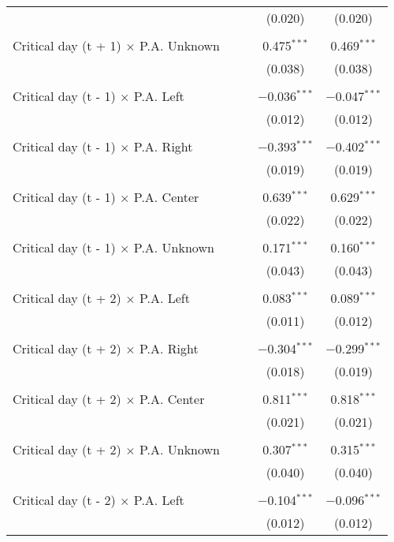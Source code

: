 \documentclass[
]{article}
\begin{document}
\begin{table}[!htbp]
{\begin{tabular}{@{\extracolsep{5pt}}lcccc}
  &  &  & (0.020) & (0.020) \\ 
  & & & & \\ 
 Critical day (t + 1) $\times$ P.A. Unknown &  &  & 0.475$^{***}$ & 0.469$^{***}$ \\ 
  &  &  & (0.038) & (0.038) \\ 
  & & & & \\ 
 Critical day (t - 1) $\times$ P.A. Left &  &  & $-$0.036$^{***}$ & $-$0.047$^{***}$ \\ 
  &  &  & (0.012) & (0.012) \\ 
  & & & & \\ 
 Critical day (t - 1) $\times$ P.A. Right &  &  & $-$0.393$^{***}$ & $-$0.402$^{***}$ \\ 
  &  &  & (0.019) & (0.019) \\ 
  & & & & \\ 
 Critical day (t - 1) $\times$ P.A. Center &  &  & 0.639$^{***}$ & 0.629$^{***}$ \\ 
  &  &  & (0.022) & (0.022) \\ 
  & & & & \\ 
 Critical day (t - 1) $\times$ P.A. Unknown &  &  & 0.171$^{***}$ & 0.160$^{***}$ \\ 
  &  &  & (0.043) & (0.043) \\ 
  & & & & \\ 
 Critical day (t + 2) $\times$ P.A. Left &  &  & 0.083$^{***}$ & 0.089$^{***}$ \\ 
  &  &  & (0.011) & (0.012) \\ 
  & & & & \\ 
 Critical day (t + 2) $\times$ P.A. Right &  &  & $-$0.304$^{***}$ & $-$0.299$^{***}$ \\ 
  &  &  & (0.018) & (0.019) \\ 
  & & & & \\ 
 Critical day (t + 2) $\times$ P.A. Center &  &  & 0.811$^{***}$ & 0.818$^{***}$ \\ 
  &  &  & (0.021) & (0.021) \\ 
  & & & & \\ 
 Critical day (t + 2) $\times$ P.A. Unknown &  &  & 0.307$^{***}$ & 0.315$^{***}$ \\ 
  &  &  & (0.040) & (0.040) \\ 
  & & & & \\ 
 Critical day (t - 2) $\times$ P.A. Left &  &  & $-$0.104$^{***}$ & $-$0.096$^{***}$ \\ 
  &  &  & (0.012) & (0.012) \\ 

\end{tabular}}
\end{table}
\end{document}
